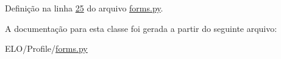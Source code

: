 Definição na linha \hyperlink{Profile_2forms_8py_source_l00025}{25} do arquivo \hyperlink{Profile_2forms_8py_source}{forms.\-py}.



A documentação para esta classe foi gerada a partir do seguinte arquivo\-:\begin{DoxyCompactItemize}
\item 
E\-L\-O/\-Profile/\hyperlink{Profile_2forms_8py}{forms.\-py}\end{DoxyCompactItemize}
